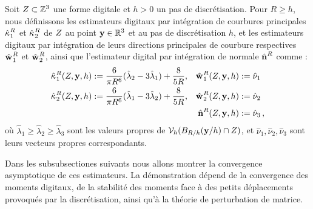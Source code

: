 \begin{definition}
  \label{def:principal-curv-estimators}
%
  Soit $Z \subset \mathbb{Z}^3$ une forme digitale et $h > 0$ un pas de
  discrétisation. Pour $R \ge h$, nous définissons les estimateurs digitaux par
  intégration de courbures principales $\hat{\kappa_{}}_{1}^{R}$ et
  $\hat{\kappa_{}}_{2}^{R}$ de $Z$ au point $\mathbf{y} \in \mathbb{R}^3$ et au pas de
  discrétisation $h$, et les estimateurs digitaux par intégration de leurs
  directions principales de courbure respectives $\hat{\mathbf{w}_{}}_{1}^{R}$ et
  $\hat{\mathbf{w}_{}}_{2}^{R}$, ainsi que l'estimateur digital par intégration de normale
  $\hat{\mathbf{n}{}}^{R}$ comme :
%
\begin{align}
  \hat{\kappa_{}}_{1}^{R}(Z,\mathbf{y},h)  &:= \frac{6}{\pi R^6}(\hat{\lambda}_2 - 3\hat{\lambda}_1) + \frac{8}{5R},
  &\hat{\mathbf{w}_{}}_{1}^{R}(Z,\mathbf{y},h) &:= \hat{\nu}_1 \\
  \hat{\kappa_{}}_{2}^{R}(Z,\mathbf{y},h) &:= \frac{6}{\pi R^6}(\hat{\lambda}_1 - 3\hat{\lambda}_2) + \frac{8}{5R},
  &\hat{\mathbf{w}_{}}_{2}^{R}(Z,\mathbf{y},h) &:= \hat{\nu}_2\\
  & &\hat{\mathbf{n}{}}^{R}(Z,\mathbf{y},h) &:=\hat{\nu}_3\,,
\end{align}
%
où $\hat{\lambda}_1 \ge \hat{\lambda}_2 \ge \hat{\lambda}_3$ sont les valeurs
propres de $\mathcal{V}_{h}(B_{R/h}(\mathbf{y} / h) \cap Z)$, et $\hat{\nu}_1,
\hat{\nu}_2, \hat{\nu}_3$ sont leurs vecteurs propres correspondants.
%
\end{definition}
%
Dans les subsubsectiones suivants nous allons montrer la convergence asymptotique de
ces estimateurs. La démonstration dépend de la convergence des moments digitaux,
de la stabilité des moments face à des petits déplacements provoqués par la
discrétisation, ainsi qu'à la théorie de perturbation de matrice.
%
